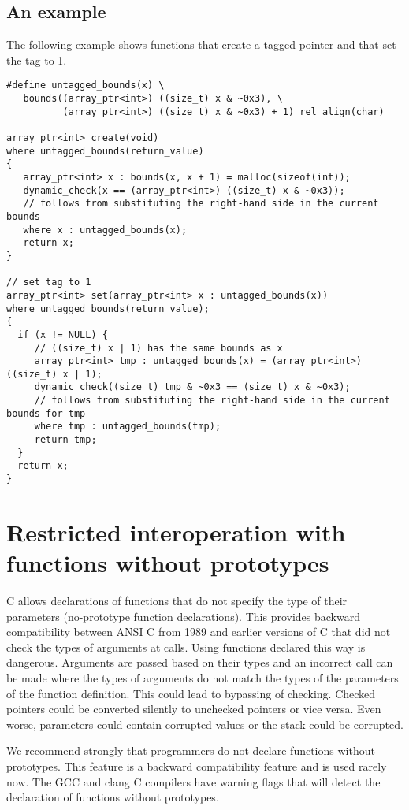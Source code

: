 \subsection{An example}

The following example shows functions that create a tagged pointer and 
that set the tag to 1.

\begin{verbatim}
#define untagged_bounds(x) \
   bounds((array_ptr<int>) ((size_t) x & ~0x3), \
          (array_ptr<int>) ((size_t) x & ~0x3) + 1) rel_align(char)

array_ptr<int> create(void) 
where untagged_bounds(return_value)
{
   array_ptr<int> x : bounds(x, x + 1) = malloc(sizeof(int));
   dynamic_check(x == (array_ptr<int>) ((size_t) x & ~0x3));
   // follows from substituting the right-hand side in the current bounds
   where x : untagged_bounds(x); 
   return x;
}

// set tag to 1
array_ptr<int> set(array_ptr<int> x : untagged_bounds(x)) 
where untagged_bounds(return_value);
{
  if (x != NULL) {
     // ((size_t) x | 1) has the same bounds as x                   
     array_ptr<int> tmp : untagged_bounds(x) = (array_ptr<int>) ((size_t) x | 1);
     dynamic_check((size_t) tmp & ~0x3 == (size_t) x & ~0x3);
     // follows from substituting the right-hand side in the current bounds for tmp
     where tmp : untagged_bounds(tmp);
     return tmp;
  }
  return x;
}
\end{verbatim}

\section{Restricted interoperation with functions without prototypes}
C allows declarations of functions that do not specify the type of their parameters
(no-prototype function declarations).  This provides backward compatibility between
ANSI C from 1989 and earlier versions of C that did not check the types of
arguments at calls.  Using functions declared this way is
dangerous.  Arguments are passed based on their types and an incorrect call can be made
where the types of arguments do not match the types of the parameters of the function
definition.  This could lead to bypassing of checking.  Checked pointers could be 
converted silently to unchecked pointers or vice versa.  Even worse, parameters could contain
corrupted values or the stack could be corrupted.

We recommend strongly that programmers do not declare functions without prototypes.  This
feature is a backward compatibility feature and is used rarely now.
The GCC and clang C compilers have warning flags that will detect the declaration of functions without 
prototypes.

